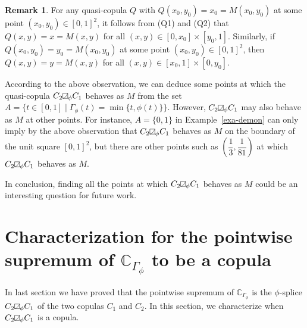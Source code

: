 \documentclass[12pt]{article}
\theoremstyle{plain}
\theoremstyle{definition}
\newtheorem{remk}[thrm]{Remark}
\newcommand{\MySs}{
\begin{tikzpicture}[baseline]
\draw (0,0em) -- (0em,0.6em) -- (0.6em,0.6em) -- (0.6em,0em) -- (0,0em);
\draw (0,0em) parabola (0.6em, 0.6em);
\end{tikzpicture}}
\begin{document}
\begin{remk}
For any quasi-copula $Q$ with $Q(x_0, y_0)=x_0=M(x_0, y_0)$ at some point $(x_0, y_0)\in[0, 1]^2$, it follows from (Q1) and (Q2)
that $Q(x, y)=x=M(x, y)$ for all $(x, y)\in[0, x_0]\times[y_0, 1]$. Similarly, if $Q(x_0, y_0)=y_0=M(x_0, y_0)$ at some point
$(x_0, y_0)\in[0, 1]^2$, then $Q(x, y)=y=M(x, y)$ for all $(x, y)\in[x_0, 1]\times[0, y_0]$.

According to the above observation, we can deduce some points at which the quasi-copula $C_2\MySs_\phi C_1$ behaves as $M$ from the set $A=\{t\in[0, 1]\mid \Gamma_\phi(t)=\min\{t, \phi(t)\}\}$. However, $C_2\MySs_\phi C_1$ may also behave as $M$ at other points. For instance, $A=\{0, 1\}$ in Example~\ref{exa-demon} can only imply by the above observation that $C_2\MySs_\phi C_1$ behaves as $M$ on the boundary of the unit square $[0, 1]^2$, but there are other points such as $(\dfrac{1}{3}, \dfrac{1}{81})$ at which
$C_2\MySs_\phi C_1$ behaves as $M$.

In conclusion, finding all the points at which $C_2\MySs_\phi C_1$ behaves as $M$ could be an interesting question for future work.
\end{remk}


\section{Characterization for the pointwise supremum of $\mathbb{C}_{\Gamma_\phi}$ to be a copula}\label{Sec-ChaCop}

In last section we have proved that the pointwise supremum of $\mathbb{C}_{\Gamma_\phi}$ is the $\phi$-splice $C_2\MySs_\phi C_1$ of the two copulas $C_1$ and $C_2$. In this section, we characterize when $C_2\MySs_\phi C_1$ is a copula.
\end{document}
